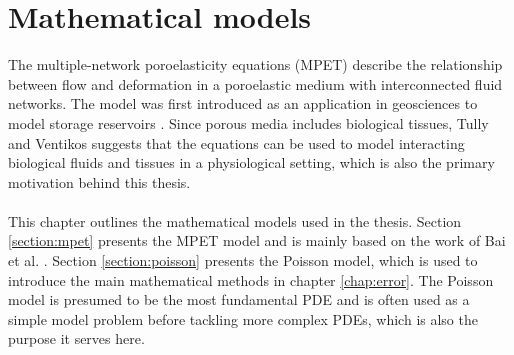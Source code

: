 \chapter{Mathematical models} 
\label{chap:math}
The multiple-network poroelasticity equations (MPET) describe the relationship between flow and deformation in a poroelastic medium with interconnected fluid networks. The model was first introduced as an application in geosciences to model storage reservoirs \cite{aifantis1979, aifantis1980, berryman2002}. Since porous media includes biological tissues, Tully and Ventikos \cite{tully} suggests that the equations can be used to model interacting biological fluids and tissues in a physiological setting, which is also the primary motivation behind this thesis. 
\\
\\
This chapter outlines the mathematical models used in the thesis. Section \ref{section:mpet} presents the MPET model and is mainly based on the work of Bai et al. \cite{bai}. Section \ref{section:poisson} presents the Poisson model, which is used to introduce the main mathematical methods in chapter \ref{chap:error}. The Poisson model is presumed to be the most fundamental PDE and is often used as a simple model problem before tackling more complex PDEs, which is also the purpose it serves here. 


